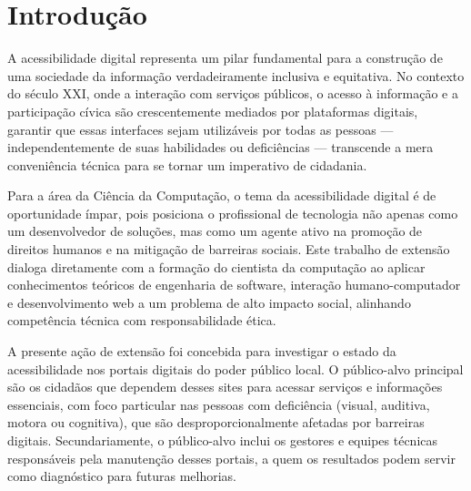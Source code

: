 \documentclass[brazil]{ifpr-pinhais}
\begin{document}
\pretextual

\imprimircapa

\imprimirfolhaderosto

\tableofcontents*
\cleardoublepage

\textual

\chapter{Introdução}

A acessibilidade digital representa um pilar fundamental para a construção de uma sociedade da informação verdadeiramente inclusiva e equitativa. No contexto do século XXI, onde a interação com serviços públicos, o acesso à informação e a participação cívica são crescentemente mediados por plataformas digitais, garantir que essas interfaces sejam utilizáveis por todas as pessoas --- independentemente de suas habilidades ou deficiências --- transcende a mera conveniência técnica para se tornar um imperativo de cidadania.

Para a área da Ciência da Computação, o tema da acessibilidade digital é de oportunidade ímpar, pois posiciona o profissional de tecnologia não apenas como um desenvolvedor de soluções, mas como um agente ativo na promoção de direitos humanos e na mitigação de barreiras sociais. Este trabalho de extensão dialoga diretamente com a formação do cientista da computação ao aplicar conhecimentos teóricos de engenharia de software, interação humano-computador e desenvolvimento web a um problema de alto impacto social, alinhando competência técnica com responsabilidade ética.

A presente ação de extensão foi concebida para investigar o estado da acessibilidade nos portais digitais do poder público local. O público-alvo principal são os cidadãos que dependem desses sites para acessar serviços e informações essenciais, com foco particular nas pessoas com deficiência (visual, auditiva, motora ou cognitiva), que são desproporcionalmente afetadas por barreiras digitais. Secundariamente, o público-alvo inclui os gestores e equipes técnicas responsáveis pela manutenção desses portais, a quem os resultados podem servir como diagnóstico para futuras melhorias.
\end{document}
